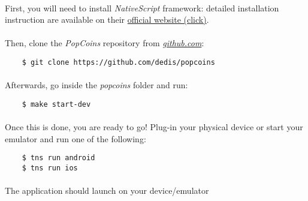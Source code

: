 \paragraph{}

First, you will need to install \textit{NativeScript} framework: detailed installation instruction are available on their \href{https://docs.nativescript.org/start/quick-setup}{official website (click)}.

\paragraph{}

Then, clone the \textit{PopCoins} repository from \href{https://github.com/dedis/popcoins}\textit{github.com}:

\begin{lstlisting}
    $ git clone https://github.com/dedis/popcoins
\end{lstlisting}

\paragraph{}

Afterwards, go inside the \textit{popcoins} folder and run:

\begin{lstlisting}
    $ make start-dev
\end{lstlisting}

\paragraph{}

Once this is done, you are ready to go! Plug-in your physical device or start your emulator and run one of the following:

\begin{lstlisting}
    $ tns run android
    $ tns run ios
\end{lstlisting}

\paragraph{}

The application should launch on your device/emulator